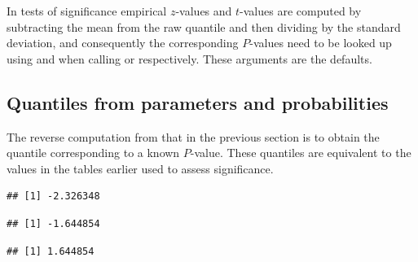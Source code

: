 \documentclass[krantz2]{krantz}\usepackage{knitr}%
\begin{document}
\begin{explainbox}
  In tests of significance empirical $z$-values and $t$-values are computed by subtracting the mean from the raw quantile and then dividing by the standard deviation, and consequently the corresponding $P$-values need to be looked up using  and  when calling  or  respectively. These arguments are the defaults.
\end{explainbox}

\subsection{Quantiles from parameters and probabilities}\label{sec:quant:prob}

The reverse computation from that in the previous section is to obtain the quantile corresponding to a known $P$-value. These quantiles are equivalent to the values in the tables earlier used to assess significance.

\begin{knitrout}\footnotesize
{}\color{fgcolor}\begin{kframe}
\begin{alltt}
\hlstd{(} \hlstd{=} \hlstd{,}  \hlstd{=} \hlstd{,}  \hlstd{=} \hlstd{)}
\end{alltt}
\begin{verbatim}
## [1] -2.326348
\end{verbatim}
\begin{alltt}
\hlstd{(} \hlstd{=} \hlstd{,}  \hlstd{=} \hlstd{,}  \hlstd{=} \hlstd{)}
\end{alltt}
\begin{verbatim}
## [1] -1.644854
\end{verbatim}
\begin{alltt}
\hlstd{(} \hlstd{=} \hlstd{,}  \hlstd{=} \hlstd{,}  \hlstd{=} \hlstd{,}  \hlstd{=} \hlstd{)}
\end{alltt}
\begin{verbatim}
## [1] 1.644854
\end{verbatim}
\end{kframe}
\end{knitrout}
\end{document}
